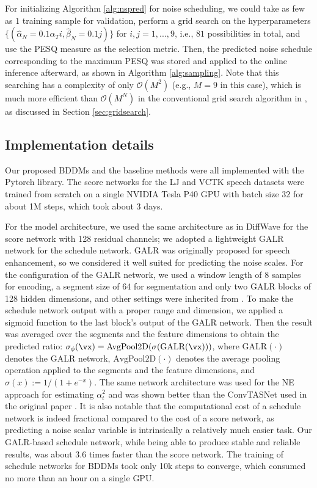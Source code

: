 For initializing Algorithm \ref{alg:nspred} for noise scheduling, we could take as few as $1$ training sample for validation, perform a grid search on the hyperparameters $\{(\hat{\alpha}_N=0.1\alpha_T i, \hat{\beta}_N=0.1j)\}$ for $i,j=1,...,9$, i.e., $81$ possibilities in total, and use the PESQ measure as the selection metric. Then, the predicted noise schedule corresponding to the maximum PESQ was stored and applied to the online inference afterward, as shown in Algorithm \ref{alg:sampling}. Note that this searching has a complexity of only $\mathcal{O}(M^{2})$ (e.g., $M=9$ in this case), which is much more efficient than $\mathcal{O}(M^{N})$ in the conventional grid search algorithm in \citep{nanxin2020}, as discussed in Section \ref{sec:gridsearch}.




\subsection{Implementation details}
Our proposed BDDMs and the baseline methods were all implemented with the Pytorch library. The score networks for the LJ and VCTK speech datasets were trained from scratch on a single NVIDIA Tesla P40 GPU with batch size $32$ for about 1M steps, which took about 3 days.

For the model architecture, we used the same architecture as in DiffWave \citep{zhifeng2021} for the score network with 128 residual channels; we adopted a lightweight GALR network \citep{lam2021effective} for the schedule network. GALR was originally proposed for speech enhancement, so we considered it well suited for predicting the noise scales. For the configuration of the GALR network, we used a window length of 8 samples for encoding, a segment size of 64 for segmentation and only two GALR blocks of 128 hidden dimensions, and other settings were inherited from \citep{lam2021effective}. To make the schedule network output with a proper range and dimension, we applied a sigmoid function to the last block's output of the GALR network. Then the result was averaged over the segments and the feature dimensions to obtain the predicted ratio: $\sigma_\phi(\vx)=\text{AvgPool2D}(\sigma(\text{GALR}(\vx)))$, where $\text{GALR}(\cdot)$ denotes the GALR network, $\text{AvgPool2D}(\cdot)$ denotes the average pooling operation applied to the segments and the feature dimensions, and $\sigma(x):=1/(1+e^{-x})$. The same network architecture was used for the NE approach for estimating $\alpha_t^2$ and was shown better than the ConvTASNet used in the original paper \citep{san2021noise}. It is also notable that the computational cost of a schedule network is indeed fractional compared to the cost of a score network, as predicting a noise scalar variable is intrinsically a relatively much easier task. Our GALR-based schedule network, while being able to produce stable and reliable results, was about 3.6 times faster than the score network. The training of schedule networks for BDDMs took only 10k steps to converge, which consumed no more than an hour on a single GPU.





